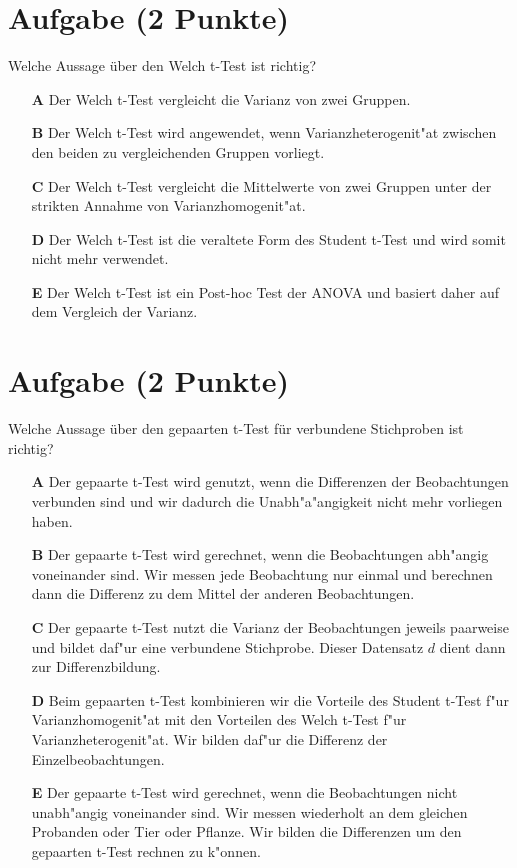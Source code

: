 \documentclass[a4paper, 9pt]{scrartcl}\usepackage[]{graphicx}\usepackage[]{xcolor}
\begin{document}
\section{Aufgabe \hfill (2 Punkte)}

Welche Aussage {\"u}ber den Welch t-Test ist richtig?



\begin{enumerate}
\item [\textbf{A} \msquare] Der Welch t-Test vergleicht die Varianz von zwei Gruppen.
\item [\textbf{B} \msquare] Der Welch t-Test wird angewendet, wenn Varianzheterogenit{"a}t zwischen den beiden zu vergleichenden Gruppen vorliegt.
\item [\textbf{C} \msquare] Der Welch t-Test vergleicht die Mittelwerte von zwei Gruppen unter der strikten Annahme von Varianzhomogenit{"a}t.
\item [\textbf{D} \msquare] Der Welch t-Test ist die veraltete Form des Student t-Test und wird somit nicht mehr verwendet.
\item [\textbf{E} \msquare] Der Welch t-Test ist ein Post-hoc Test der ANOVA und basiert daher auf dem Vergleich der Varianz.
\end{enumerate}

\section{Aufgabe \hfill (2 Punkte)}

Welche Aussage {\"u}ber den gepaarten t-Test f{\"u}r verbundene Stichproben ist richtig?



\begin{enumerate}
\item [\textbf{A} \msquare] Der gepaarte t-Test wird genutzt, wenn die Differenzen der Beobachtungen verbunden sind und wir dadurch die Unabh{"a}{"a}ngigkeit nicht mehr vorliegen haben.
\item [\textbf{B} \msquare] Der gepaarte t-Test wird gerechnet, wenn die Beobachtungen abh{"a}ngig voneinander sind. Wir messen jede Beobachtung nur einmal und berechnen dann die Differenz zu dem Mittel der anderen Beobachtungen.
\item [\textbf{C} \msquare] Der gepaarte t-Test nutzt die Varianz der Beobachtungen jeweils paarweise und bildet daf{"u}r eine verbundene Stichprobe. Dieser Datensatz $d$ dient dann zur Differenzbildung.
\item [\textbf{D} \msquare] Beim gepaarten t-Test kombinieren wir die Vorteile des Student t-Test f{"u}r Varianzhomogenit{"a}t mit den Vorteilen des Welch t-Test f{"u}r Varianzheterogenit{"a}t. Wir bilden daf{"u}r die Differenz der Einzelbeobachtungen.
\item [\textbf{E} \msquare] Der gepaarte t-Test wird gerechnet, wenn die Beobachtungen nicht unabh{"a}ngig voneinander sind. Wir messen wiederholt an dem gleichen Probanden oder Tier oder Pflanze. Wir bilden die Differenzen um den gepaarten t-Test rechnen zu k{"o}nnen.
\end{enumerate}
\end{document}
